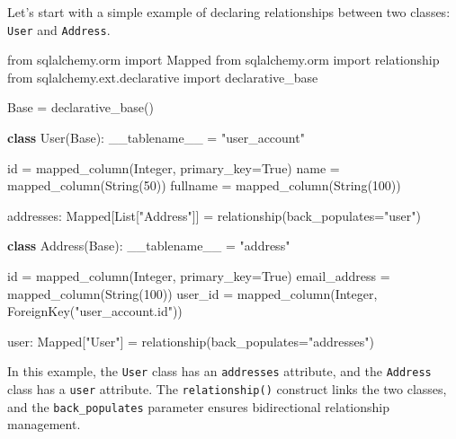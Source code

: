\documentclass[
  letterpaper,
  DIV=11,
  numbers=noendperiod]{scrreprt}
\newenvironment{Shaded}{\begin{snugshade}}{\end{snugshade}}
\newcommand{\BuiltInTok}[1]{\textcolor[rgb]{0.00,0.23,0.31}{#1}}
\newcommand{\DecValTok}[1]{\textcolor[rgb]{0.68,0.00,0.00}{#1}}
\newcommand{\ImportTok}[1]{\textcolor[rgb]{0.00,0.46,0.62}{#1}}
\newcommand{\KeywordTok}[1]{\textcolor[rgb]{0.00,0.23,0.31}{\textbf{#1}}}
\newcommand{\NormalTok}[1]{\textcolor[rgb]{0.00,0.23,0.31}{#1}}
\newcommand{\OperatorTok}[1]{\textcolor[rgb]{0.37,0.37,0.37}{#1}}
\newcommand{\StringTok}[1]{\textcolor[rgb]{0.13,0.47,0.30}{#1}}
\newcommand{\VariableTok}[1]{\textcolor[rgb]{0.07,0.07,0.07}{#1}}
\begin{document}
Let's start with a simple example of declaring relationships between two
classes: \texttt{User} and \texttt{Address}.

\begin{Shaded}
\begin{Highlighting}[]
\ImportTok{from}\NormalTok{ sqlalchemy.orm }\ImportTok{import}\NormalTok{ Mapped}
\ImportTok{from}\NormalTok{ sqlalchemy.orm }\ImportTok{import}\NormalTok{ relationship}
\ImportTok{from}\NormalTok{ sqlalchemy.ext.declarative }\ImportTok{import}\NormalTok{ declarative\_base}

\NormalTok{Base }\OperatorTok{=}\NormalTok{ declarative\_base()}

\KeywordTok{class}\NormalTok{ User(Base):}
\NormalTok{    \_\_tablename\_\_ }\OperatorTok{=} \StringTok{"user\_account"}

    \BuiltInTok{id} \OperatorTok{=}\NormalTok{ mapped\_column(Integer, primary\_key}\OperatorTok{=}\VariableTok{True}\NormalTok{)}
\NormalTok{    name }\OperatorTok{=}\NormalTok{ mapped\_column(String(}\DecValTok{50}\NormalTok{))}
\NormalTok{    fullname }\OperatorTok{=}\NormalTok{ mapped\_column(String(}\DecValTok{100}\NormalTok{))}
    
\NormalTok{    addresses: Mapped[List[}\StringTok{"Address"}\NormalTok{]] }\OperatorTok{=}\NormalTok{ relationship(back\_populates}\OperatorTok{=}\StringTok{"user"}\NormalTok{)}

\KeywordTok{class}\NormalTok{ Address(Base):}
\NormalTok{    \_\_tablename\_\_ }\OperatorTok{=} \StringTok{"address"}

    \BuiltInTok{id} \OperatorTok{=}\NormalTok{ mapped\_column(Integer, primary\_key}\OperatorTok{=}\VariableTok{True}\NormalTok{)}
\NormalTok{    email\_address }\OperatorTok{=}\NormalTok{ mapped\_column(String(}\DecValTok{100}\NormalTok{))}
\NormalTok{    user\_id }\OperatorTok{=}\NormalTok{ mapped\_column(Integer, ForeignKey(}\StringTok{"user\_account.id"}\NormalTok{))}
    
\NormalTok{    user: Mapped[}\StringTok{"User"}\NormalTok{] }\OperatorTok{=}\NormalTok{ relationship(back\_populates}\OperatorTok{=}\StringTok{"addresses"}\NormalTok{)}
\end{Highlighting}
\end{Shaded}

In this example, the \texttt{User} class has an \texttt{addresses}
attribute, and the \texttt{Address} class has a \texttt{user} attribute.
The \texttt{relationship()} construct links the two classes, and the
\texttt{back\_populates} parameter ensures bidirectional relationship
management.
\end{document}
